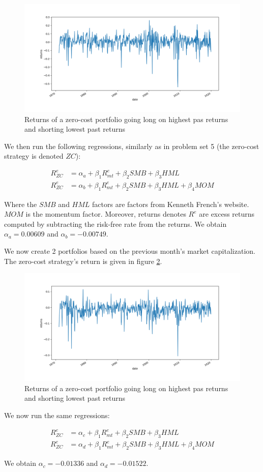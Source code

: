 \documentclass[10pt]{article}
\begin{document}
\begin{figure}[h]
    \centering
    \includegraphics[scale=0.5]{ps8_ex2_plot1.png}
    \caption{Returns of a zero-cost portfolio going  long on highest pas returns and shorting lowest past returns}
    \label{ps8_ex2_plot1}    
\end{figure}

We then run the following regressions, similarly as in problem set 5 (the zero-cost strategy is denoted $ZC$):

\begin{align*}	
	R^{e}_{ZC} &= \alpha_a +  \beta_1 R^e_{mt} + \beta_2 SMB + \beta_3 HML \\
	R^{e}_{ZC}  &= \alpha_b + \beta_1 R^e_{mt} + \beta_2 SMB + \beta_3 HML + \beta_4 MOM
\end{align*}  

Where the $SMB$ and $HML$ factors are factors from Kenneth French’s website. $MOM$ is the momentum factor. Moreover, returns denotes $R^e$ are excess returns computed by subtracting the risk-free rate from the returns. We obtain $\alpha_{a} = 0.00609$ and $\alpha_{b} = -0.00749$.   
   
\bigbreak

We now create 2 portfolios based on the previous month's market capitalization.  The zero-cost strategy's return is given in figure \ref{ps8_ex2_plot2}.

\begin{figure}[h]
    \centering
    \includegraphics[scale=0.5]{ps8_ex2_plot2.png}
    \caption{Returns of a zero-cost portfolio going  long on highest pas returns and shorting lowest past returns}
    \label{ps8_ex2_plot2}    
\end{figure}

We now run the same regressions:

\begin{align*}	
	R^{e}_{ZC} &= \alpha_c +  \beta_1 R^e_{mt}  + \beta_2 SMB + \beta_3 HML \\
	R^{e}_{ZC}  &= \alpha_d + \beta_1 R^e_{mt} + \beta_2 SMB + \beta_3 HML + \beta_4 MOM
\end{align*}  

We obtain $\alpha_{c} = -0.01336$ and $\alpha_{d} = -0.01522$.
   
\end{document}

